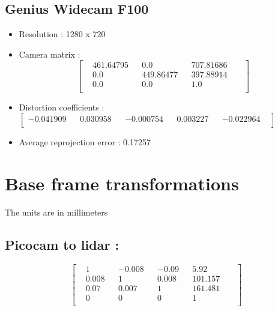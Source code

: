 {\subsection{Genius Widecam F100}

\begin{itemize}
	\setlength\itemsep{1em}
	\item Resolution : 1280 x 720
	\item Camera matrix : 
	\begin{equation*}     
	\begin{bmatrix}
	& 461.64795     & & 0.0 & &  707.81686  & &  \\
	& 0.0       & & 449.86477     & &  397.88914   & &\\
	& 0.0       & & 0.0          & &   1.0  & &\\
	\end{bmatrix}
	\end{equation*}
	\item Distortion coefficients : 
	$ \begin{bmatrix}  
	-0.041909    & &    0.030958   & &   -0.000754   & &   0.003227  & &  -0.022964   & \\
	\end{bmatrix} $ 
	\item Average reprojection error : 0.17257
\end{itemize}
\newpage

\section{Base frame transformations}
\label{section:A.3}
The units are in millimeters

\subsection{Picocam to \acrshort{lidar} :} 
\vspace{15mm}
\begin{equation*}     
	\begin{bmatrix}
	 & 1	 & &    -0.008	& &  -0.09   	& &  5.92  & & \\ 
	& 0.008	& &       1	    & &   0.008	   & &   101.157 & & \\
	& 0.07	& &     0.007	& &    1	  & &    161.481 & & \\
	& 0  	    & &       0	    & &    0	 & &      1     & &   \\
	\end{bmatrix}
\end{equation*}
\\
}
